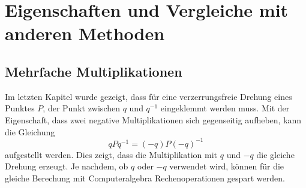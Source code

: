 %
%
%
%

\section{Eigenschaften und Vergleiche mit anderen Methoden\label{qa:section:eigenschaften}}
\subsection{Mehrfache Multiplikationen}
Im letzten Kapitel wurde gezeigt, dass für eine verzerrungsfreie 
Drehung eines Punktes $P$, der Punkt zwischen $q$ und $q^{-1}$ 
eingeklemmt werden muss. Mit der Eigenschaft, dass zwei negative 
Multiplikationen sich gegenseitig aufheben, kann die  
Gleichung
\begin{equation*}
    q P q^{-1} = (-q) P (-q)^{-1}
\end{equation*}
aufgestellt werden. Dies zeigt, dass die Multiplikation mit $q$ und 
$-q$ die gleiche Drehung erzeugt. Je nachdem, ob $q$ oder $-q$ 
verwendet wird, können für die gleiche Berechung mit 
Computeralgebra Rechenoperationen gespart werden.

